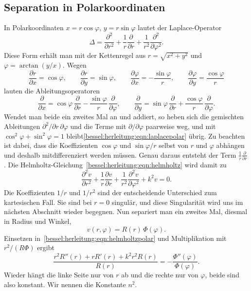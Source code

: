 \subsection{Separation in Polarkoordinaten
\label{bessel:herleitung:subsection:polar}}
In Polarkoordinaten $x=r\cos\varphi$, $y=r\sin\varphi$ lautet der Laplace-Operator
\begin{equation}
\Delta
=
\frac{\partial^2}{\partial r^2}
+
\frac{1}{r}\frac{\partial}{\partial r}
+
\frac{1}{r^2}\frac{\partial^2}{\partial\varphi^2}.
\label{bessel:herleitung:eqn:laplacepolar}
\end{equation}
Diese Form erhält man mit der Kettenregel aus $r=\sqrt{x^2+y^2}$ und $\varphi=\arctan(y/x)$.
Wegen
\[
\frac{\partial r}{\partial x} = \cos\varphi,
\qquad
\frac{\partial r}{\partial y} = \sin\varphi,
\qquad
\frac{\partial\varphi}{\partial x} = -\frac{\sin\varphi}{r},
\qquad
\frac{\partial\varphi}{\partial y} = \frac{\cos\varphi}{r}
\]
lauten die Ableitungsoperatoren
\[
\frac{\partial}{\partial x}
=
\cos\varphi\,\frac{\partial}{\partial r}
-
\frac{\sin\varphi}{r}\,\frac{\partial}{\partial\varphi},
\qquad
\frac{\partial}{\partial y}
=
\sin\varphi\,\frac{\partial}{\partial r}
+
\frac{\cos\varphi}{r}\,\frac{\partial}{\partial\varphi}.
\]
Wendet man beide ein zweites Mal an und addiert, so heben sich die gemischten Ableitungen 
$\partial^2/\partial r\,\partial\varphi$ und die Terme mit $\partial/\partial\varphi$ paarweise weg, 
und mit $\cos^2\varphi+\sin^2\varphi=1$ bleibt\eqref{bessel:herleitung:eqn:laplacepolar} übrig.
Zu beachten ist dabei, dass die Koeffizienten $\cos\varphi$ und $\sin\varphi/r$ selbst von $r$ und $\varphi$ abhängen und deshalb mitdifferenziert werden müssen.
Genau daraus entsteht der Term $\frac{1}{r}\frac{\partial}{\partial r}$.
Die Helmholtz-Gleichung~\eqref{bessel:herleitung:eqn:helmholtz} wird damit zu
\begin{equation}
\frac{\partial^2 v}{\partial r^2}
+
\frac{1}{r}\frac{\partial v}{\partial r}
+
\frac{1}{r^2}\frac{\partial^2 v}{\partial\varphi^2}
+
k^2 v
=
0.
\label{bessel:herleitung:eqn:helmholtzpolar}
\end{equation}
Die Koeffizienten $1/r$ und $1/r^2$ sind der entscheidende Unterschied zum kartesischen Fall.
Sie sind bei $r=0$ singulär, und diese Singularität wird uns im nächsten Abschnitt wieder begegnen.
Nun separiert man ein zweites Mal, diesmal in Radius und Winkel,
\begin{equation}
v(r,\varphi)
=
R(r)\,\Phi(\varphi).
\label{bessel:herleitung:eqn:radialsep}
\end{equation}
Einsetzen in~\eqref{bessel:herleitung:eqn:helmholtzpolar} und Multiplikation mit $r^2/(R\Phi)$ ergibt
\[
\frac{r^2R''(r) + rR'(r) + k^2r^2R(r)}{R(r)}
=
-\frac{\Phi''(\varphi)}{\Phi(\varphi)}.
\]
Wieder hängt die linke Seite nur von $r$ ab und die rechte nur von $\varphi$, beide sind also konstant.
Wir nennen die Konstante $n^2$.
 
